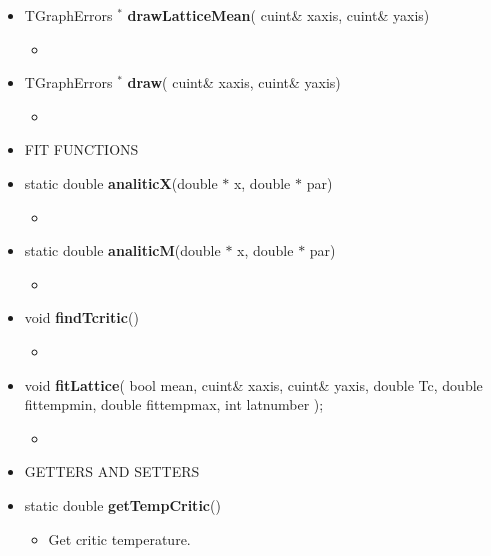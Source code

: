 \begin{itemize}
\begin{itemize}
  \item[] TGraphErrors ${}^*$ \textbf{drawLatticeMean}(
    cuint\& x\textunderscore axis,
    cuint\& y\textunderscore axis)
    \begin{itemize}
    \item[]
    \end{itemize}

  \item[] TGraphErrors ${}^*$ \textbf{draw}(
    cuint\& x\textunderscore axis,
    cuint\& y\textunderscore axis)
    \begin{itemize}
    \item[] 
    \end{itemize}

\newpage

  \item[] FIT FUNCTIONS \\

  \item[] static double \textbf{analiticX}(double $*$ x, double $*$ par)
    \begin{itemize}
    \item[]
    \end{itemize}

  \item[] static double \textbf{analiticM}(double $*$ x, double $*$ par)
    \begin{itemize}
    \item[]
    \end{itemize}

  \item[] void \textbf{findTcritic}()
    \begin{itemize}
    \item[]
    \end{itemize}

  \item[] void \textbf{fitLattice}( bool mean,
    cuint\& x\textunderscore axis,
    cuint\& y\textunderscore axis,
    double Tc,
    double fit\textunderscore temp\textunderscore min,
    double fit\textunderscore temp\textunderscore max,
    int lat\textunderscore number
    );
    \begin{itemize}
    \item[]
    \end{itemize}


  \item[]       GETTERS AND SETTERS \\

  \item[] static double \textbf{getTempCritic}()
    \begin{itemize}
    \item[] Get critic temperature.
    \end{itemize}


\end{itemize}
\end{itemize}
